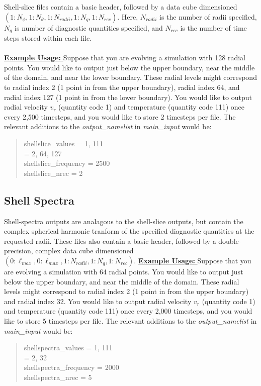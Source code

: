 \documentclass[12pt,letterpaper]{article}
\begin{document}
Shell-slice files contain a basic header, followed by a data cube dimensioned $(1:N_\phi,1:N_\theta,1:N_{radii}, 1:N_q,1:N_{rec})$.  Here, $N_{radii}$ is the number of radii specified, $N_q$ is number of diagnostic quantities specified, and $N_{rec}$ is the number of time steps stored within each file.
\\
\\
\noindent\underline{\textbf{Example Usage:  }}
Suppose that you are evolving a simulation with 128 radial points.  You would like to output just below the upper boundary, near the middle of the domain, and near the lower boundary.  These radial levels might correspond to radial index 2 (1 point in from the upper boundary), radial index 64, and radial index 127 (1 point in from the lower boundary).  You would like to output radial velocity $v_r$ (quantity code 1) and temperature (quantity code 111) once every 2,500 timesteps, and you would like to store 2 timesteps per file.  The relevant additions to the \textit{output\_namelist} in  \textit{main\_input}  would be:
\blockquote{\noindent shellslice\_values = 1, 111
\\
 = 2, 64, 127
\\
\noindent shellslice\_frequency = 2500
\\
\noindent shellslice\_nrec = 2
}

\subsection{Shell Spectra}
Shell-spectra outputs are analagous to the shell-slice outputs, but contain the complex spherical harmonic tranform of the specified diagnostic quantities at the requested radii.  These files also contain a basic header, followed by a double-precision, complex data cube dimensioned $(0:\ell_{max},0:\ell_{max},1:N_{radii}, 1:N_q,1:N_{rec})$.
\noindent\underline{\textbf{Example Usage:  }}
Suppose that you are evolving a simulation with 64 radial points.  You would like to output just below the upper boundary, and near the middle of the domain.  These radial levels might correspond to radial index 2 (1 point in from the upper boundary) and radial index 32. You would like to output radial velocity $v_r$ (quantity code 1) and temperature (quantity code 111) once every 2,000 timesteps, and you would like to store 5 timesteps per file.  The relevant additions to the \textit{output\_namelist} in  \textit{main\_input}  would be:
\blockquote{\noindent shellspectra\_values = 1, 111
\\
 = 2, 32
\\
\noindent shellspectra\_frequency = 2000
\\
\noindent shellspectra\_nrec = 5
}
\end{document}
